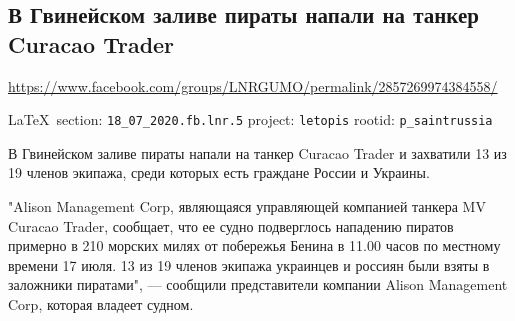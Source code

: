  
 
\subsection{В Гвинейском заливе пираты напали на танкер Curacao Trader}
\url{https://www.facebook.com/groups/LNRGUMO/permalink/2857269974384558/}
  
\vspace{0.5cm}
{\small\LaTeX~section: \verb|18_07_2020.fb.lnr.5| project: \verb|letopis| rootid: \verb|p_saintrussia|}
\vspace{0.5cm}
  
В Гвинейском заливе пираты напали на танкер Curacao Trader и захватили 13 из 19
членов экипажа, среди которых есть граждане России и Украины.

"Alison Management Corp, являющаяся управляющей компанией танкера MV Curacao
Trader, сообщает, что ее судно подверглось нападению пиратов примерно в 210
морских милях от побережья Бенина в 11.00 часов по местному времени 17 июля. 13
из 19 членов экипажа украинцев и россиян были взяты в заложники пиратами", —
сообщили представители компании Alison Management Corp, которая владеет судном.
